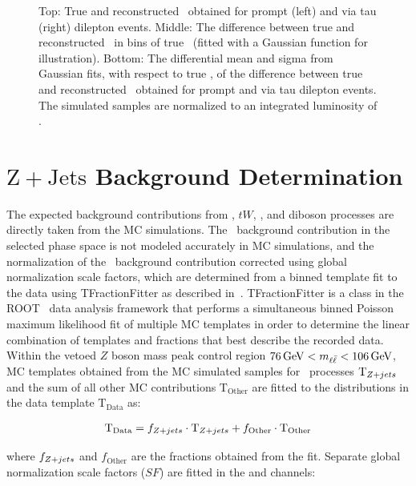 \begin{figure}
\begin{center}
    \caption{\small Top: True and reconstructed \yt\ obtained for prompt (left) and via tau (right) \ttbar dilepton events.
    Middle: The difference between true and reconstructed \yt\ in bins of true \yt\ (fitted with a Gaussian function for illustration).
    Bottom: The differential mean and sigma from Gaussian fits, with respect to true \yt, of the difference between true and reconstructed \yt\ obtained for prompt and via tau \ttbar dilepton events.
    The simulated samples are normalized to an integrated luminosity of \lumivalueRuniiUL.}
    \label{fig:kinrec:resolution-yt}
 \end{center}
\end{figure}


\section{\ensuremath{\mathrm{Z+Jets}} Background Determination}
\label{Zjets_Background_Determination}
The expected background contributions from \ttbar, $tW$, \wjets, and diboson processes are directly taken from the MC simulations.
The \zjets\ background contribution in the selected phase space is not modeled accurately in MC simulations, and the normalization of the \zjets\ background contribution corrected using global normalization scale factors, which are determined from a binned template fit to the data using TFractionFitter as described in~\cite{CMS-PAS-TOP-20-006}\cite{BARLOW1993219}.
TFractionFitter is a class in the ROOT~\cite{Antcheva:2011zz} data analysis framework that performs a simultaneous binned Poisson maximum likelihood fit of multiple MC templates in order to determine the linear combination of templates and fractions that best describe the recorded data. 
Within the vetoed $Z$ boson mass peak control region $\SI{76}{\GeV} < \mll < \SI{106}{\GeV}$, MC templates obtained from the MC simulated samples for \zjets\ processes $\text{T}_{Z+jets}$ and the sum of all other MC contributions $\text{T}_\text{Other}$ are fitted to the \mll distributions in the data template $\text{T}_\text{Data}$ as:
\begin{linenomath*}
\begin{align}
\text{T}_\text{Data} = f_{Z+jets} \cdot \text{T}_{Z+jets} + f_{\text{Other}} \cdot \text{T}_\text{Other}
\end{align}
\end{linenomath*}
where $f_{Z+jets}$ and $f_{\text{Other}}$ are the fractions obtained from the fit.
Separate global normalization scale factors ($SF$) are fitted in the \ee and \mumu channels:
